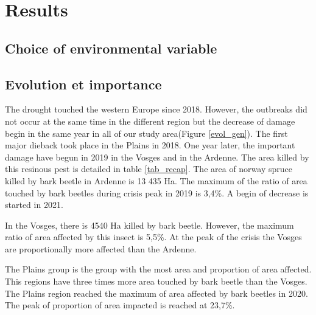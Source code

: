 \documentclass[3p,procedia]{elsarticle}
\begin{document}
	






\section{Results}

\subsection{Choice of environmental variable}

\subsection{Evolution et importance}

The drought touched the western Europe since 2018.
However, the outbreaks did not occur at the same time in the different region but the decrease of damage begin in the same year in all of our study area(Figure \ref{evol_gen}).
The first major dieback took place in the Plains in 2018.
One year later, the important damage have begun in 2019 in the Vosges and in the Ardenne.  
The area killed by this resinous pest is detailed in table \ref{tab_recap}.
The area of norway spruce killed by bark beetle in Ardenne is 13 435 Ha.
The maximum of the ratio of area touched by bark beetles during crisis peak in 2019 is 3,4\%. 
A begin of decrease is started in 2021.

In the Vosges, there is 4540 Ha killed by bark beetle.
However, the maximum ratio of area affected by this insect is 5,5\%.
At the peak of the crisis the Vosges are proportionally more affected than the Ardenne.

The Plains group is the group with the most area and proportion of area affected.
This regions have three times more area touched by bark beetle than the Vosges.
The Plains region reached the maximum of area affected by bark beetles in 2020. 
The peak of proportion of area impacted is reached at 23,7\%.
\end{document}

